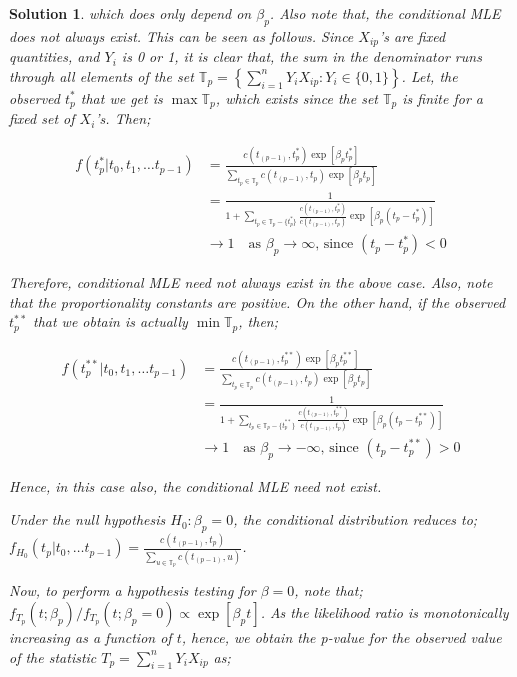 \documentclass[12pt]{article}
\theoremstyle{problemstyle}
\newtheorem*{solution*}{Solution}
\begin{document}
\begin{solution*}
which does only depend on $\beta_p$. Also note that, the conditional MLE does not always exist. This can be seen as follows. Since $X_{ip}$'s are fixed quantities, and $Y_i$ is 0 or 1, it is clear that, the sum in the denominator runs through all elements of the set $\mathbb{T}_p = \left\{ \sum_{i=1}^{n}Y_iX_{ip} : Y_i \in \{0, 1\} \right\}$. Let, the observed $t^\ast_p$ that we get is $\max \mathbb{T}_p$, which exists since the set $\mathbb{T}_p$ is finite for a fixed set of $X_i$'s. Then;

\begin{align*}
	f(t^\ast_p \vert t_0, t_1, \dots t_{p-1}) & = \frac{c(t_{(p-1)}, t^\ast_p)\exp\left[\beta_pt^\ast_p\right]}{\sum_{t_p \in \mathbb{T}_p} c(t_{(p-1)}, t_p) \exp\left[\beta_pt_p\right]}\\
	& = \frac{1}{1 + \sum_{t_p \in \mathbb{T}_p - \{t^\ast_p\}} \frac{c(t_{(p-1)}, t^\ast_p)}{c(t_{(p-1)}, t_p)}\exp\left[\beta_p(t_p - t^\ast_p) \right]}\\
	& \rightarrow 1 \quad \text{as } \beta_p \rightarrow \infty \text{, since } (t_p - t^\ast_p) < 0
\end{align*}

Therefore, conditional MLE need not always exist in the above case. Also, note that the proportionality constants are positive. On the other hand, if the observed $t^{\ast\ast}_p$ that we obtain is actually $\min\mathbb{T}_p$, then;

\begin{align*}
f(t^{\ast\ast}_p \vert t_0, t_1, \dots t_{p-1}) & = \frac{c(t_{(p-1)}, t^{\ast\ast}_p)\exp\left[\beta_pt^{\ast\ast}_p\right]}{\sum_{t_p \in \mathbb{T}_p} c(t_{(p-1)}, t_p) \exp\left[\beta_pt_p\right]}\\
& = \frac{1}{1 + \sum_{t_p \in \mathbb{T}_p - \{t^{\ast\ast}_p\}} \frac{c(t_{(p-1)}, t^{\ast\ast}_p)}{c(t_{(p-1)}, t_p)}\exp\left[\beta_p(t_p - t^{\ast\ast}_p) \right]}\\
& \rightarrow 1 \quad \text{as } \beta_p \rightarrow -\infty \text{, since } (t_p - t^{\ast\ast}_p) > 0
\end{align*}

Hence, in this case also, the conditional MLE need not exist.

Under the null hypothesis $H_0 : \beta_p = 0$, the conditional distribution reduces to; $f_{H_0}(t_p \vert t_0, \dots t_{p-1}) = \frac{c(t_{(p-1)}, t_p)}{\sum_{u \in \mathbb{T}_p} c(t_{(p-1)}, u)}$. 

Now, to perform a hypothesis testing for $\beta = 0$, note that; $f_{T_p}(t; \beta_p)/f_{T_p}(t; \beta_p = 0) \propto \exp\left[ \beta_p t\right]$. As the likelihood ratio is monotonically increasing as a function of $t$, hence, we obtain the p-value for the observed value of the statistic $T_p = \sum_{i=1}^{n} Y_i X_{ip}$ as;


\end{solution*}
\end{document}
